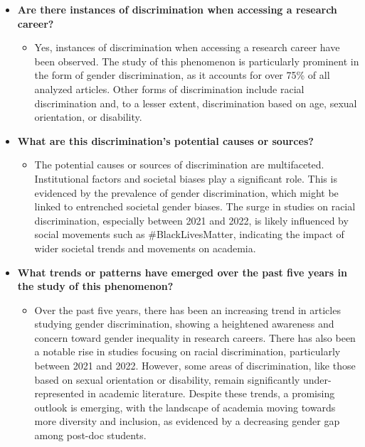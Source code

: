 \documentclass[runningheads]{llncs}
\begin{document}
\begin{itemize}
  \item \textbf{Are there instances of discrimination when accessing a research career?}
  \begin{itemize}
      \item Yes, instances of discrimination when accessing a research career have been observed. The study of this phenomenon is particularly prominent in the form of gender discrimination, as it accounts for over 75\% of all analyzed articles. Other forms of discrimination include racial discrimination and, to a lesser extent, discrimination based on age, sexual orientation, or disability.
  \end{itemize}

  \item \textbf{What are this discrimination's potential causes or sources?}
  \begin{itemize}
      \item The potential causes or sources of discrimination are multifaceted. Institutional factors and societal biases play a significant role. This is evidenced by the prevalence of gender discrimination, which might be linked to entrenched societal gender biases. The surge in studies on racial discrimination, especially between 2021 and 2022, is likely influenced by social movements such as \#BlackLivesMatter, indicating the impact of wider societal trends and movements on academia.
  \end{itemize}

  \item \textbf{What trends or patterns have emerged over the past five years in the study of this phenomenon?}
  \begin{itemize}
      \item Over the past five years, there has been an increasing trend in articles studying gender discrimination, showing a heightened awareness and concern toward gender inequality in research careers. There has also been a notable rise in studies focusing on racial discrimination, particularly between 2021 and 2022. However, some areas of discrimination, like those based on sexual orientation or disability, remain significantly under-represented in academic literature. Despite these trends, a promising outlook is emerging, with the landscape of academia moving towards more diversity and inclusion, as evidenced by a decreasing gender gap among post-doc students.
  \end{itemize}


\end{itemize}
\end{document}
